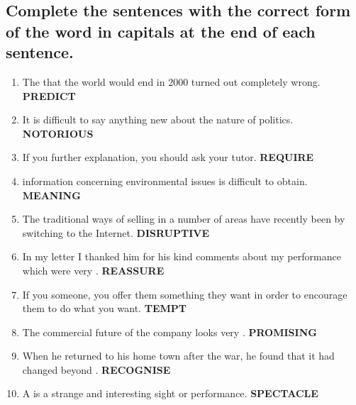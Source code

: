 \subsection*{Complete the sentences with the correct form of the word in capitals at the end of each
      sentence.}
\begin{enumerate}
      \item The \underline{\hspace{2cm}} that the world would end in 2000 turned out completely wrong. \textbf{PREDICT}
      \item It is \underline{\hspace{2cm}} difficult to say anything new about the nature of politics. \textbf{NOTORIOUS}
      \item If you \underline{\hspace{2cm}} further explanation, you should ask your tutor. \textbf{REQUIRE}
      \item \underline{\hspace{2cm}} information concerning environmental issues is difficult to obtain. \textbf{MEANING}
      \item The traditional ways of selling in a number of areas have recently been \underline{\hspace{2cm}} by switching to the Internet. \textbf{DISRUPTIVE}
      \item In my letter I thanked him for his kind comments about my performance which were very \underline{\hspace{2cm}}. \textbf{REASSURE}
      \item If you \underline{\hspace{2cm}} someone, you offer them something they want in order to encourage them to do what you want. \textbf{TEMPT}
      \item The commercial future of the company looks very \underline{\hspace{2cm}}. \textbf{PROMISING}
      \item When he returned to his home town after the war, he found that it had changed beyond \underline{\hspace{2cm}}. \textbf{RECOGNISE}
      \item A \underline{\hspace{2cm}} is a strange and interesting sight or performance. \textbf{SPECTACLE}
\end{enumerate}

